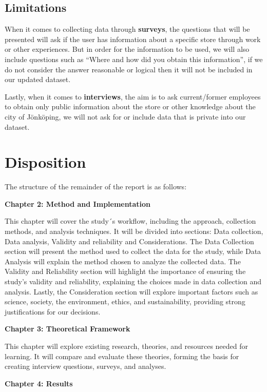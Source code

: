 \subsection{Limitations}


When it comes to collecting data through \textbf{surveys}, the questions that will be presented will ask if the user has information about a specific store through work or other experiences. But in order for the information to be used, we will also include questions such as “Where and how did you obtain this information”, if we do not consider the answer reasonable or logical then it will not be included in our updated dataset. 


Lastly, when it comes to \textbf{interviews}, the aim is to ask current/former employees to obtain only public information about the store or other knowledge about the city of Jönköping, we will not ask for or include data that is private into our dataset. 

\section{Disposition}
The structure of the remainder of the report is as follows: 

\textbf{Chapter 2: Method and Implementation}

This chapter will cover the study´s workflow, including the approach, collection methods, and analysis techniques. It will be divided into sections: Data collection, Data analysis, Validity and reliability and Considerations. The Data Collection section will present the method used to collect the data for the study, while Data Analysis will explain the method chosen to analyze the collected data. The Validity and Reliability section will highlight the importance of ensuring the study’s validity and reliability, explaining the choices made in data collection and analysis. Lastly, the Consideration section will explore important factors such as science, society, the environment, ethics, and sustainability, providing strong justifications for our decisions.




\textbf{Chapter 3: Theoretical Framework} 

This chapter will explore existing research, theories, and resources needed for learning. It will compare and evaluate these theories, forming the basis for creating interview questions, surveys, and analyses.  

\textbf{Chapter 4: Results}

